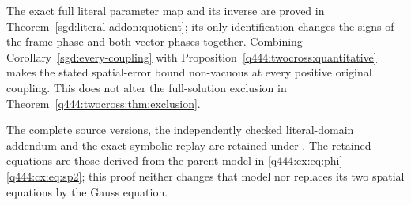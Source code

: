 The exact full literal parameter map and its inverse are proved in
Theorem~\ref{sgd:literal-addon:quotient}; its only identification changes
the signs of the frame phase and both vector phases together. Combining
Corollary~\ref{sgd:every-coupling} with
Proposition~\ref{q444:twocross:quantitative} makes the stated spatial-error
bound non-vacuous at every positive original coupling. This does not alter
the full-solution exclusion in Theorem~\ref{q444:twocross:thm:exclusion}.

The complete source versions, the independently checked literal-domain
addendum and the exact symbolic replay are retained under
.
The retained equations are those derived from the parent model in
\eqref{q444:cx:eq:phi}--\eqref{q444:cx:eq:sp2}; this proof neither changes
that model nor replaces its two spatial equations by the Gauss equation.
